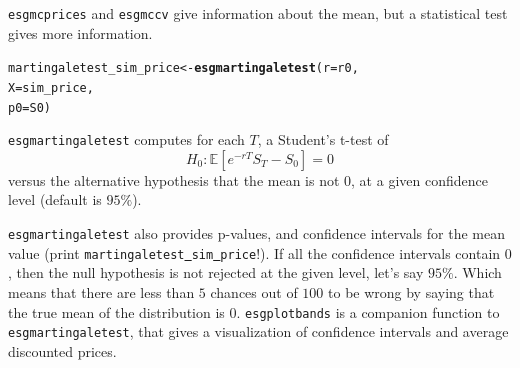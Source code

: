 \documentclass[a4paper]{article}\usepackage[]{graphicx}\usepackage[]{color}
\makeatletter
\newcommand{\hlstd}[1]{\textcolor[rgb]{0.345,0.345,0.345}{#1}}%
\newcommand{\hlkwb}[1]{\textcolor[rgb]{0.69,0.353,0.396}{#1}}%
\newcommand{\hlkwc}[1]{\textcolor[rgb]{0.333,0.667,0.333}{#1}}%
\newcommand{\hlkwd}[1]{\textcolor[rgb]{0.737,0.353,0.396}{\textbf{#1}}}%
\newenvironment{kframe}{%
 \def\at@end@of@kframe{}%
 \ifinner\ifhmode%
  \def\at@end@of@kframe{\end{minipage}}%
  \begin{minipage}{\columnwidth}%
 \fi\fi%
 \def\FrameCommand##1{\hskip\@totalleftmargin \hskip-\fboxsep
 \colorbox{shadecolor}{##1}\hskip-\fboxsep
     \hskip-\linewidth \hskip-\@totalleftmargin \hskip\columnwidth}%
 \MakeFramed {\advance\hsize-\width
   \@totalleftmargin\z@ \linewidth\hsize
   \@setminipage}}%
 {\par\unskip\endMakeFramed%
 \at@end@of@kframe}
\newenvironment{knitrout}{}{} %
\newcommand{\EE}{\ensuremath{\mathbb{E}} }
\newcommand{\code}[1]{\mbox{\texttt{#1}}}
\makeatother
\begin{document}
\code{esgmcprices} and \code{esgmccv} give information about the mean, but a statistical test gives more information.  

\begin{knitrout}
\color{fgcolor}\begin{kframe}
\begin{alltt}
\hlstd{martingaletest_sim_price} \hlkwb{<-} \hlkwd{esgmartingaletest}\hlstd{(}\hlkwc{r} \hlstd{= r0,}
                                              \hlkwc{X} \hlstd{= sim_price,}
                                              \hlkwc{p0} \hlstd{= S0)}
\end{alltt}
\end{kframe}
\end{knitrout}

\code{esgmartingaletest} computes for each $T$, a Student's t-test of 
$$H_0 : \EE[e^{-rT}S_T - S_0] = 0$$
versus the alternative hypothesis that the mean is not $0$, at a given confidence level (default is $95\%$).

\medskip

\code{esgmartingaletest} also provides p-values, and confidence intervals for the mean value (print \code{martingaletest\underline{ }sim\underline{ }price}!). If all the confidence intervals contain $0$, then the null hypothesis is not rejected at the given level, let's say $95\%$. Which means that there are less than $5$ chances out of $100$ to be wrong by saying that the true mean of the distribution is $0$. \code{esgplotbands} is a companion function to \code{esgmartingaletest}, that gives a visualization of confidence intervals and average discounted prices. 
\end{document}
